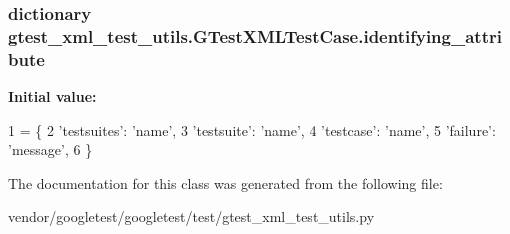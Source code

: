 \subsubsection[{\texorpdfstring{identifying\+\_\+attribute}{identifying_attribute}}]{\setlength{\rightskip}{0pt plus 5cm}dictionary gtest\+\_\+xml\+\_\+test\+\_\+utils.\+G\+Test\+X\+M\+L\+Test\+Case.\+identifying\+\_\+attribute\hspace{0.3cm}{\ttfamily [static]}}\hypertarget{classgtest__xml__test__utils_1_1GTestXMLTestCase_a0e3a4e84e18f29d2248dcd670a0a6ae6}{}\label{classgtest__xml__test__utils_1_1GTestXMLTestCase_a0e3a4e84e18f29d2248dcd670a0a6ae6}
{\bfseries Initial value\+:}
\begin{DoxyCode}
1 = \{
2     \textcolor{stringliteral}{'testsuites'}: \textcolor{stringliteral}{'name'},
3     \textcolor{stringliteral}{'testsuite'}: \textcolor{stringliteral}{'name'},
4     \textcolor{stringliteral}{'testcase'}:  \textcolor{stringliteral}{'name'},
5     \textcolor{stringliteral}{'failure'}:   \textcolor{stringliteral}{'message'},
6     \}
\end{DoxyCode}


The documentation for this class was generated from the following file\+:\begin{DoxyCompactItemize}
\item 
vendor/googletest/googletest/test/gtest\+\_\+xml\+\_\+test\+\_\+utils.\+py\end{DoxyCompactItemize}

